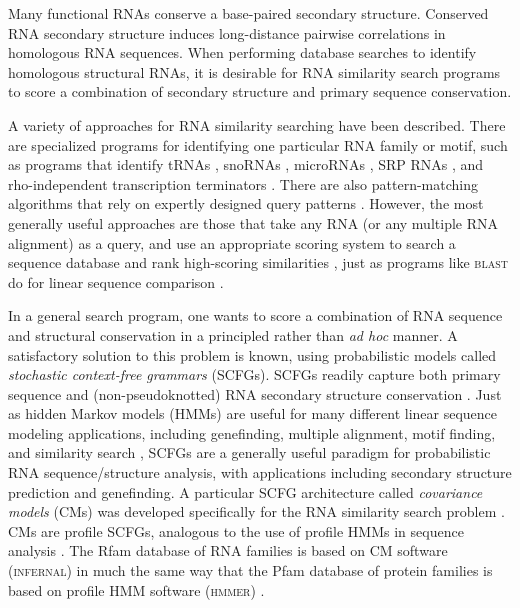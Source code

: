 \documentclass[11pt]{article}
\begin{document}
Many functional RNAs conserve a base-paired secondary structure.
Conserved RNA secondary structure induces long-distance pairwise
correlations in homologous RNA sequences.  When performing database
searches to identify homologous structural RNAs, it is desirable for
RNA similarity search programs to score a combination of secondary
structure and primary sequence conservation.

A variety of approaches for RNA similarity searching have been
described. There are specialized programs for identifying one
particular RNA family or motif, such as programs that identify tRNAs
\cite{LoweEddy97,Laslett04}, snoRNAs \cite{LoweEddy99,Schattner06},
microRNAs \cite{Lai03, Lim03}, SRP RNAs \cite{Regalia02}, and
rho-independent transcription terminators \cite{Ermolaeva00}. There
are also pattern-matching algorithms that rely on expertly designed
query patterns \cite{Macke01}. However, the most generally useful
approaches are those that take any RNA (or any multiple RNA alignment)
as a query, and use an appropriate scoring system to search a sequence
database and rank high-scoring similarities
\cite{Gautheret01,ZhangBafna05}, just as programs like \textsc{blast}
do for linear sequence comparison \cite{Altschul97}.

In a general search program, one wants to score a
combination of RNA sequence and structural conservation in a
principled rather than \emph{ad hoc} manner. A satisfactory solution
to this problem is known, using probabilistic models called
\emph{stochastic context-free grammars} (SCFGs). SCFGs readily capture
both primary sequence and (non-pseudoknotted) RNA secondary structure
conservation \cite{Sakakibara94c,Durbin98}. Just as hidden Markov
models (HMMs) are useful for many different linear sequence modeling
applications, including genefinding, multiple alignment, motif
finding, and similarity search \cite{Durbin98}, SCFGs are a generally
useful paradigm for probabilistic RNA sequence/structure analysis,
with applications including secondary structure prediction and
genefinding. A particular SCFG architecture called \emph{covariance
models} (CMs) was developed specifically for the RNA similarity search
problem \cite{Eddy94}.  CMs are profile SCFGs, analogous to the use of
profile HMMs in sequence analysis \cite{Eddy94,Eddy02b}.  The Rfam
database of RNA families \cite{Griffiths-Jones05} is based on CM
software (\textsc{infernal}) in much the same way that the Pfam
database of protein families is based on profile HMM software
(\textsc{hmmer}) \cite{Sonnhammer98,Finn06}.
\end{document}
